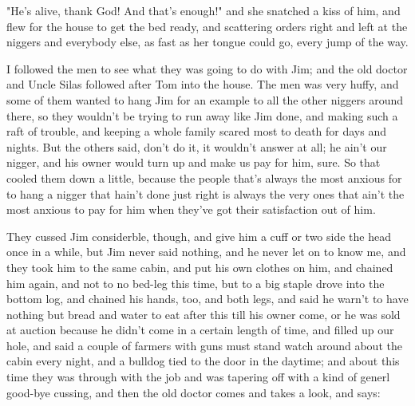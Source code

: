 "He's alive, thank God!  And that's enough!" and she snatched a kiss of
him, and flew for the house to get the bed ready, and scattering orders
right and left at the niggers and everybody else, as fast as her tongue
could go, every jump of the way.

I followed the men to see what they was going to do with Jim; and the old
doctor and Uncle Silas followed after Tom into the house.  The men was
very huffy, and some of them wanted to hang Jim for an example to all the
other niggers around there, so they wouldn't be trying to run away like
Jim done, and making such a raft of trouble, and keeping a whole family
scared most to death for days and nights.  But the others said, don't do
it, it wouldn't answer at all; he ain't our nigger, and his owner would
turn up and make us pay for him, sure.  So that cooled them down a
little, because the people that's always the most anxious for to hang a
nigger that hain't done just right is always the very ones that ain't the
most anxious to pay for him when they've got their satisfaction out of
him.

They cussed Jim considerble, though, and give him a cuff or two side the
head once in a while, but Jim never said nothing, and he never let on to
know me, and they took him to the same cabin, and put his own clothes on
him, and chained him again, and not to no bed-leg this time, but to a big
staple drove into the bottom log, and chained his hands, too, and both
legs, and said he warn't to have nothing but bread and water to eat after
this till his owner come, or he was sold at auction because he didn't
come in a certain length of time, and filled up our hole, and said a
couple of farmers with guns must stand watch around about the cabin every
night, and a bulldog tied to the door in the daytime; and about this time
they was through with the job and was tapering off with a kind of generl
good-bye cussing, and then the old doctor comes and takes a look, and
says:

